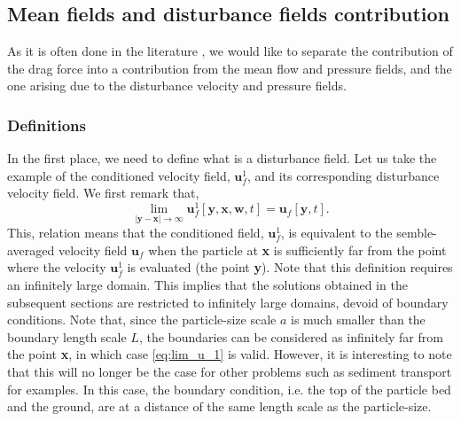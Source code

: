 \subsection{Mean fields and disturbance fields contribution}

As it is often done in the literature \citep{zhang1994ensemble,jackson2000,wang2021numerical,wang2024effect}, we would like to separate the contribution of the drag force into a contribution from the mean flow and pressure fields, and the one arising due to the disturbance velocity and pressure fields.  

\subsubsection{Definitions}

In the first place, we need to define what is a disturbance field.
Let us take the example of the conditioned velocity field, $\textbf{u}_f^1$, and its corresponding disturbance velocity field.
We first remark that,   
\begin{equation}
    \lim_{|\textbf{y}-\textbf{x}|\to\infty} 
    \textbf{u}_f^1[\textbf{y},\textbf{x},\textbf{w},t]
    =
    \textbf{u}_f[\textbf{y},t]. 
    \label{eq:lim_u_1}
\end{equation} 
This, relation means that the conditioned field, $\textbf{u}_f^1$, is equivalent to the semble-averaged velocity field $\textbf{u}_f$ when the particle at \textbf{x} is sufficiently far from the point where the velocity $\textbf{u}_f^1$ is evaluated (the point \textbf{y}). 
Note that this definition requires an infinitely large domain. 
This implies that the solutions obtained in the subsequent sections are restricted to infinitely large domains, devoid of boundary conditions.
Note that, since the particle-size scale $a$ is much smaller than the boundary length scale $L$, the boundaries can be considered as infinitely far from the point \textbf{x}, in which case \ref{eq:lim_u_1} is valid.
However, it is interesting to note that this will no longer be the case for other problems such as sediment transport for examples.
In this case, the boundary condition, i.e. the top of the particle bed and the ground, are at a distance of the same length scale as the particle-size. 

